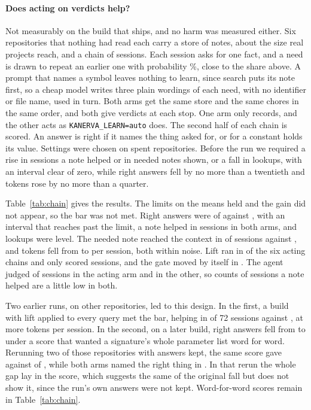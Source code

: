 \paragraph{Does acting on verdicts help?} Not measurably on the build that ships, and no harm was measured either. Six repositories that nothing had read each carry a store of  notes, about the size real projects reach, and a chain of  sessions. Each session asks for one fact, and a need is drawn to repeat an earlier one with probability \%, close to the share above. A prompt that names a symbol leaves nothing to learn, since search puts its note first, so a cheap model writes three plain wordings of each need, with no identifier or file name, used in turn. Both arms get the same store and the same chores in the same order, and both give verdicts at each stop. One arm only records, and the other acts as \texttt{KANERVA\_LEARN=auto} does. The second half of each chain is scored. An answer is right if it names the thing asked for, or for a constant holds its value. Settings were chosen on spent repositories. Before the run we required a rise in sessions a note helped or in needed notes shown, or a fall in lookups, with an interval clear of zero, while right answers fell by no more than a twentieth and tokens rose by no more than a quarter.

Table~\ref{tab:chain} gives the results. The limits on the means held and the gain did not appear, so the bar was not met. Right answers were  of  against , with an interval that reaches past the limit, a note helped in  sessions in both arms, and lookups were level. The needed note reached the context in  of sessions against , and tokens fell from  to  per session, both within noise. Lift ran in  of the six acting chains and only  scored sessions, and the gate moved by itself in . The agent judged  of  sessions in the acting arm and  in the other, so counts of sessions a note helped are a little low in both.

Two earlier runs, on other repositories, led to this design. In the first, a build with lift applied to every query met the bar, helping in  of 72 sessions against , at  more tokens per session. In the second, on a later build, right answers fell from  to  under a score that wanted a signature's whole parameter list word for word. Rerunning two of those repositories with answers kept, the same score gave  against  of , while both arms named the right thing in . In that rerun the whole gap lay in the score, which suggests the same of the original fall but does not show it, since the run's own answers were not kept. Word-for-word scores remain in Table~\ref{tab:chain}.

